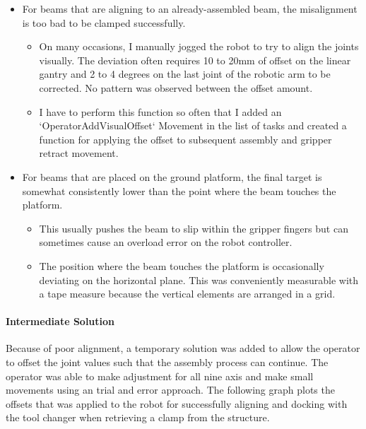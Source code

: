 \begin{itemize}
	\item For beams that are aligning to an already-assembled beam, the misalignment is too bad to be clamped successfully. 

\begin{itemize}
	\item On many occasions, I manually jogged the robot to try to align the joints visually. The deviation often requires 10 to 20mm of offset on the linear gantry and 2 to 4 degrees on the last joint of the robotic arm to be corrected. No pattern was observed between the offset amount.

	\item I have to perform this function so often that I added an `OperatorAddVisualOffset` Movement in the list of tasks and created a function for applying the offset to subsequent assembly and gripper retract movement. 

\end{itemize}
	\item For beams that are placed on the ground platform, the final target is somewhat consistently lower than the point where the beam touches the platform. 

\begin{itemize}
	\item This usually pushes the beam to slip within the gripper fingers but can sometimes cause an overload error on the robot controller.

	\item The position where the beam touches the platform is occasionally deviating on the horizontal plane. This was conveniently measurable with a tape measure because the vertical elements are arranged in a grid.

\end{itemize}
\end{itemize}

\paragraph{Intermediate Solution}

Because of poor alignment, a temporary solution was added to allow the operator to offset the joint values such that the assembly process can continue. The operator was able to make adjustment for all nine axis and make small movements using an trial and error approach. The following graph plots the offsets that was applied to the robot for successfully aligning and docking with the tool changer when retrieving a clamp from the structure.


